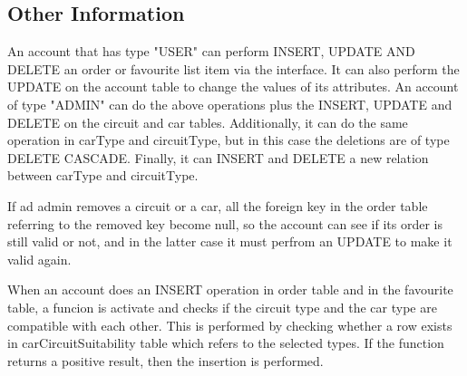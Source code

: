 \subsection{Other Information}

An account that has type "USER" can perform INSERT, UPDATE AND DELETE an order or favourite list item via the interface. It can also perform the UPDATE on the account table to change the values of its attributes. An account of type "ADMIN" can do the above operations plus the INSERT, UPDATE and DELETE on the circuit and car tables. Additionally, it can do the same operation in carType and circuitType, but in this case the deletions are of type DELETE CASCADE. Finally, it can INSERT and DELETE a new relation between carType and circuitType.

If ad admin removes a circuit or a car, all the foreign key in the order table referring to the removed key become null, so the account can see if its order is still valid or not, and in the latter case it must perfrom an UPDATE to make it valid again.

When an account does an INSERT operation in order table and in the favourite table, a funcion is activate and checks if the circuit type and the car type are compatible with each other. This is performed by checking whether a row exists in carCircuitSuitability table which refers to the selected types. If the function returns a positive result, then the insertion is performed.